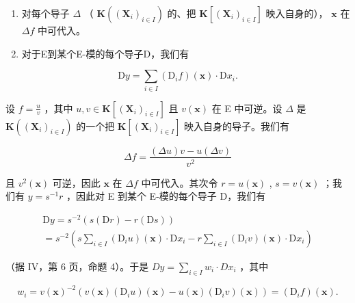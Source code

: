 \begin{enumerate}
\def\labelenumi{(\roman{enumi})}
\item
  对每个导子 \(\Delta\) （ \(\mathbf{K}((\mathbf{X}_i)_{i\in I})\) 的、把 \(\mathbf{K}[(\mathbf{X}_i)_{i\in I}]\) 映入自身的）， \(\mathbf{x}\) 在 \(\Delta f\) 中可代入。
\item
  对于E到某个E-模的每个导子D，我们有
\end{enumerate}

\[
\mathrm{D} y = \sum_ {i \in I} (\mathrm{D} _ {i} f) (\mathbf {x}) \cdot \mathrm{D} x _ {i}.
\]

设 \(f = \frac{u}{v}\) ，其中 \(u, v \in \mathbf{K}[(\mathbf{X}_i)_{i \in I}]\) 且 \(v(\mathbf{x})\) 在 E 中可逆。设 \(\Delta\) 是 \(\mathbf{K}((\mathbf{X}_i)_{i \in I})\) 的一个把 \(\mathbf{K}[(\mathbf{X}_i)_{i \in I}]\) 映入自身的导子。我们有

\[
\Delta f = \frac {(\Delta u) v - u (\Delta v)}{v ^ {2}}
\]

且 \(v^2(\mathbf{x})\) 可逆，因此 \(\mathbf{x}\) 在 \(\Delta f\) 中可代入。其次令 \(r = u(\mathbf{x})\) , \(s = v(\mathbf{x})\) ；我们有 \(y = s^{-1}r\) ，因此对 E 到某个 E-模的每个导子 D，我们有

\[
\begin{array}{l} \mathrm{D} y = s ^ {- 2} (s (\mathrm{D} r) - r (\mathrm{D} s)) \\ = s ^ {- 2} \left(s \sum_ {i \in I} (\mathrm{D} _ {i} u) (\mathbf {x}) \cdot \mathrm{D} x _ {i} - r \sum_ {i \in I} (\mathrm{D} _ {i} v) (\mathbf {x}) \cdot \mathrm{D} x _ {i}\right) \end{array}
\]

（据 IV，第 6 页，命题 4）。于是 \(Dy = \sum_{i \in I} w_i \cdot Dx_i\) ，其中

\[
w _ {i} = v (\mathbf {x}) ^ {- 2} (v (\mathbf {x}) \left(\mathrm{D} _ {i} u\right) (\mathbf {x}) - u (\mathbf {x}) \left(\mathrm{D} _ {i} v\right) (\mathbf {x})) = \left(\mathrm{D} _ {i} f\right) (\mathbf {x}).
\]

